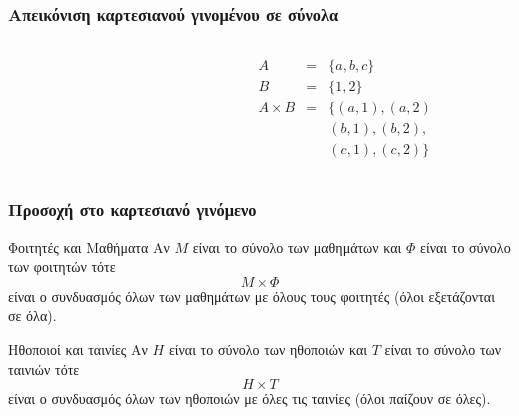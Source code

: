 \begin{frame}
\frametitle{Απεικόνιση καρτεσιανού γινομένου σε σύνολα}
\begin{minipage}{\wE}
  \begin{columns}[T]
    \begin{column}{0.5\textwidth}
      
    \end{column}
    \begin{column}{0.5\textwidth}
     \begin{align*}
       A &=& \{a,b,c\} \\
       B &=& \{1,2\}  \\
       A \times B &=& \{ (a,1), (a,2) \\
                  &&     (b,1), (b,2), \\
                  &&     (c,1), (c,2) \}
     \end{align*}
    \end{column}
  \end{columns}
\end{minipage}
\end{frame}



\begin{frame}
\frametitle{Προσοχή στο καρτεσιανό γινόμενο}
\begin{minipage}{\wE}
  \begin{exampleblock}{Φοιτητές και Μαθήματα}
    Αν $M$ είναι το σύνολο των μαθημάτων 
    και $\Phi$ είναι το σύνολο των φοιτητών 
    τότε
    \vspace*{-0.5cm} \[ M \times \Phi \]    %
    είναι ο συνδυασμός όλων των μαθημάτων με όλους τους φοιτητές
    (όλοι εξετάζονται σε όλα).
  \end{exampleblock}
  \begin{exampleblock}{Ηθοποιοί και ταινίες}
    Αν $H$ είναι το σύνολο των ηθοποιών
    και $T$ είναι το σύνολο των ταινιών
    τότε \vspace*{-0.5cm}    \[ H \times T \]    %
    είναι ο συνδυασμός όλων των ηθοποιών με όλες τις ταινίες
    (όλοι παίζουν σε όλες).
  \end{exampleblock}

\end{minipage}
\end{frame}
